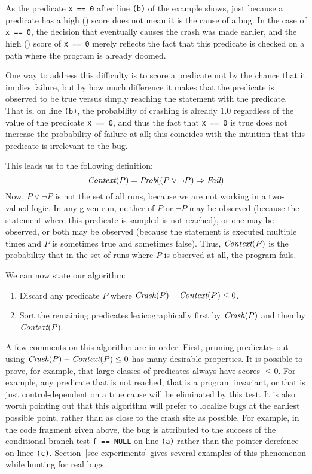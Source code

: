As the predicate {\tt x == 0} after line {\tt (b)} of the example
shows, just because a predicate has a high \crash() score does not
mean it is the cause of a bug.  In the case of {\tt x == 0}, the
decision that eventually causes the crash was made earlier, and the
high \crash() score of {\tt x == 0} merely reflects the fact that this
predicate is checked on a path where the program is already doomed.

One way to address this difficulty is to score a predicate not by the chance
that it implies failure, but by how much difference it makes that the predicate
is observed to be true versus simply reaching the statement with the predicate.
That is, on line {\tt (b)}, the probability of crashing is already 1.0 regardless
of the value of the predicate {\tt x == 0}, and thus the fact that {\tt x == 0} is
true does not increase the probability of failure at all; this coincides with
the intuition that this predicate is irrelevant to the bug.

This leads us to the following definition:
\[ \mbox{\em Context}(P) = \mbox{\em Prob}((P \vee \neg P) \Rightarrow \mbox{\em Fail}) \]
Now, $P \vee \neg P$ is not the set of all runs, because we are not working in a two-valued logic.
In any given run, neither of $P$ or $\neg P$ may be observed (because the statement where this predicate is
sampled is not reached), or one may be observed, or both may be observed (because the statement is executed
multiple times and $P$ is sometimes true and sometimes false).  Thus, $\mbox{\em Context}(P)$ is the probability that
in the set of runs where $P$ is observed at all, the program fails.

We can now state our algorithm:
\begin{enumerate}
\item Discard any predicate $P$ where $\mbox{\em Crash}(P) - \mbox{\em Context}(P) \leq 0$.

\item Sort the remaining predicates lexicographically first by $\mbox{\em Crash}(P)$ and then by $\mbox{\em Context}(P)$.
\end{enumerate}

A few comments on this algorithm are in order.  First, pruning
predicates out using $\mbox{\em Crash}(P) - \mbox{\em Context}(P) \leq 0$ has many
desirable properties.  It is possible to prove, for example, that
large classes of predicates always have scores $\leq 0$.  For example,
any predicate that is not reached, that is a program invariant, or
that is just control-dependent on a true cause will be eliminated by
this test.  It is also worth pointing out that this algorithm will
prefer to localize bugs at the earliest possible point, rather than
as close to the crash site as possible.  For example, in the code fragment
given above, the bug is attributed to the success of the conditional branch
test {\tt f == NULL} on line {\tt (a)} rather than the pointer derefence
on lince {\tt (c)}.  Section~\ref{sec-experiments} gives several examples of
this phenomenon while hunting for real bugs.

